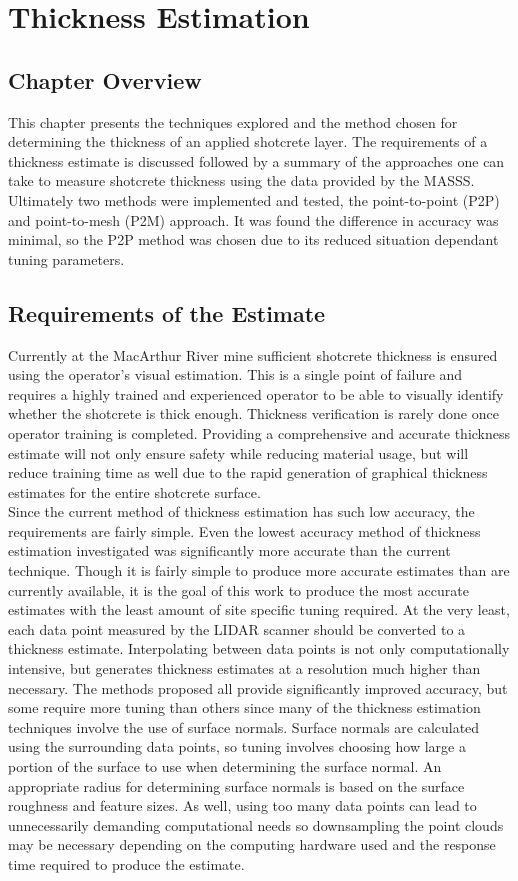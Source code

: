 \chapter{Thickness Estimation}
\label{chap:thick}
\section{Chapter Overview}
This chapter presents the techniques explored and the method chosen for determining the thickness of an applied shotcrete layer. The requirements of a thickness estimate is discussed followed by a summary of the approaches one can take to measure shotcrete thickness using the data provided by the MASSS. Ultimately two methods were implemented and tested, the point-to-point (P2P) and point-to-mesh (P2M) approach. It was found the difference in accuracy was minimal, so the P2P method was chosen due to its reduced situation dependant tuning parameters.\\
\section{Requirements of the Estimate}
Currently at the MacArthur River mine sufficient shotcrete thickness is ensured using the operator's visual estimation. This is a single point of failure and requires a highly trained and experienced operator to be able to visually identify whether the shotcrete is thick enough. Thickness verification is rarely done once operator training is completed. Providing a comprehensive and accurate thickness estimate will not only ensure safety while reducing material usage, but will reduce training time as well due to the rapid generation of graphical thickness estimates for the entire shotcrete surface.\\

Since the current method of thickness estimation has such low accuracy, the requirements are fairly simple. Even the lowest accuracy method of thickness estimation investigated was significantly more accurate than the current technique. Though it is fairly simple to produce more accurate estimates than are currently available, it is the goal of this work to produce the most accurate estimates with the least amount of site specific tuning required. At the very least, each data point measured by the LIDAR scanner should be converted to a thickness estimate. Interpolating between data points is not only computationally intensive, but generates thickness estimates at a resolution much higher than necessary. The methods proposed all provide significantly improved accuracy, but some require more tuning than others since many of the thickness estimation techniques involve the use of surface normals. Surface normals are calculated using the surrounding data points, so tuning involves choosing how large a portion of the surface to use when determining the surface normal. An appropriate radius for determining surface normals is based on the surface roughness and feature sizes. As well, using too many data points can lead to unnecessarily demanding computational needs so downsampling the point clouds may be necessary depending on the computing hardware used and the response time required to produce the estimate.\\


